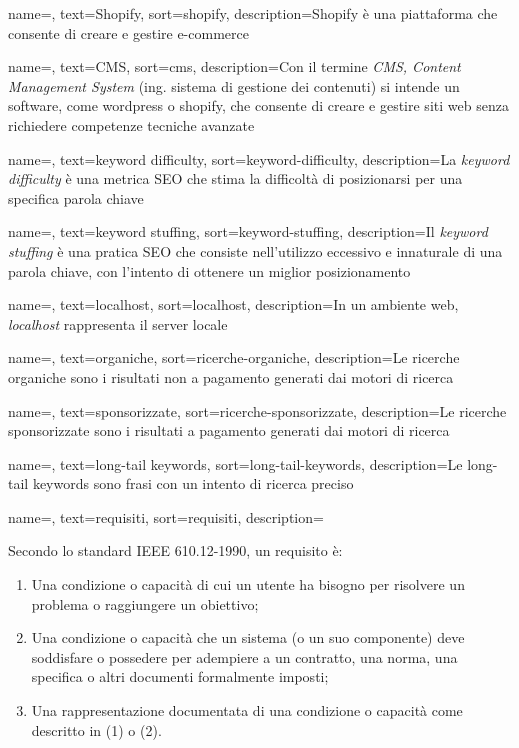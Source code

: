  {
    name=,
    text=Shopify,
    sort=shopify,
    description={Shopify è una piattaforma che consente di creare e gestire e-commerce}
}

 {
    name=,
    text=CMS,
    sort=cms,
    description={Con il termine \emph{CMS, Content Management System} (ing. sistema di gestione dei contenuti) si intende un software, come \gls{wordpress} o \gls{shopify}, che consente di creare e gestire siti web senza richiedere competenze tecniche avanzate}
}

 {
    name=,
    text=keyword difficulty,
    sort=keyword-difficulty,
    description={La \emph{keyword difficulty} è una metrica SEO che stima la difficoltà di posizionarsi per una specifica parola chiave}
}

 {
    name=,
    text=keyword stuffing,
    sort=keyword-stuffing,
    description={Il \emph{keyword stuffing} è una pratica SEO che consiste nell'utilizzo eccessivo e innaturale di una parola chiave, con l'intento di ottenere un miglior posizionamento}
}

 {
    name=,
    text=localhost,
    sort=localhost,
    description={In un ambiente web, \emph{localhost} rappresenta il server locale}
}

 {
    name=,
    text=organiche,
    sort=ricerche-organiche,
    description={Le ricerche organiche sono i risultati non a pagamento generati dai motori di ricerca}
}

 {
    name=,
    text=sponsorizzate,
    sort=ricerche-sponsorizzate,
    description={Le ricerche sponsorizzate sono i risultati a pagamento generati dai motori di ricerca}
}

 {
    name=,
    text=long-tail keywords,
    sort=long-tail-keywords,
    description={Le long-tail keywords sono frasi con un intento di ricerca preciso}
}

 {
    name=,
    text=requisiti,
    sort=requisiti,
    description={Secondo lo standard IEEE 610.12-1990, un requisito è:
    \begin{enumerate}
        \item Una condizione o capacità di cui un utente ha bisogno per risolvere un problema o raggiungere un obiettivo;
        \item Una condizione o capacità che un sistema (o un suo componente) deve soddisfare o possedere per adempiere a un contratto, una norma, una specifica o altri documenti formalmente imposti;
        \item Una rappresentazione documentata di una condizione o capacità come descritto in (1) o (2).
    \end{enumerate}
    }
}

